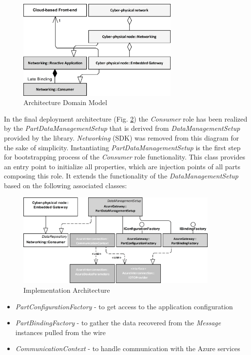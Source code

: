 \documentclass{article}
\begin{document}
\begin{figure}
      \centering
      \includegraphics[width=8cm]{../../.Media/ImplementationDomainModel.png}
      \caption{Architecture Domain Model}\label{figure3.ImplementationDomainModel}
\end{figure}


In the final deployment architecture (Fig. \ref{figure4.ImplementationArchitecture}) the \emph{Consumer} role has been realized by the \emph{PartDataManagementSetup} that is derived from \emph{DataManagementSetup} provided by the library. \emph{Networking} (SDK) was removed from this diagram for the sake of simplicity. Instantiating \emph{PartDataManagementSetup} is the first step for bootstrapping process of the \emph{Consumer} role functionality. This class provides an entry point to initialize all properties, which are injection points of all parts composing this role. It extends the functionality of the \emph{DataManagementSetup} based on the following associated classes:

\begin{figure}
      \centering
      \includegraphics[width=10cm]{../../.Media/ImplementationArchitecture.png}
      \caption{Implementation Architecture}\label{figure4.ImplementationArchitecture}
\end{figure}

\begin{itemize}
      \item \emph{PartConfigurationFactory} - to get access to the application configuration
      \item \emph{PartBindingFactory} - to gather the data recovered from the \emph{Message} instances pulled from the wire
      \item \emph{CommunicationContext} - to handle communication with the Azure services
\end{itemize}
\end{document}
